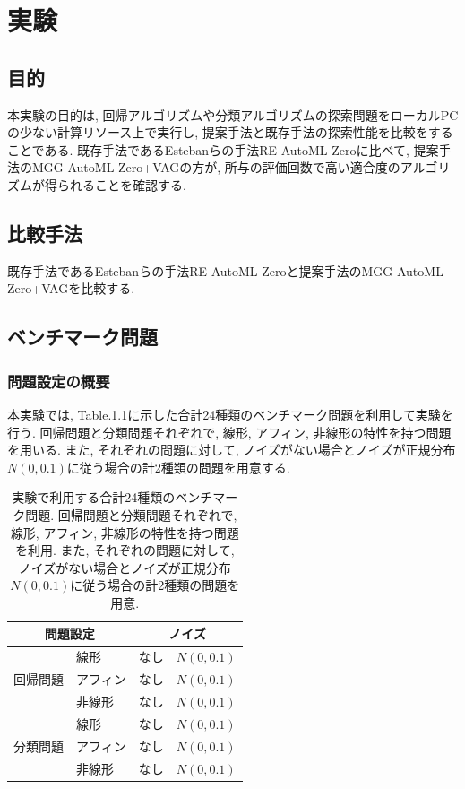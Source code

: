 \documentclass[11pt,oneside,openany,report]{jsbook}
\begin{document}
\chapter{実験} \label{chap:exp}

\section{目的}\label{sec:exp:purpose}

本実験の目的は, 回帰アルゴリズムや分類アルゴリズムの探索問題をローカルPCの少ない計算リソース上で実行し, 提案手法と既存手法の探索性能を比較をすることである. 既存手法であるEstebanらの手法RE-AutoML-Zero\cite{automl_zero}に比べて, 提案手法のMGG-AutoML-Zero+VAGの方が, 所与の評価回数で高い適合度のアルゴリズムが得られることを確認する.

\section{比較手法}\label{sec:exp:compair_method}
既存手法であるEstebanらの手法RE-AutoML-Zeroと提案手法のMGG-AutoML-Zero+VAGを比較する.

\section{ベンチマーク問題}\label{sec:exp:benchmark}

\subsection{問題設定の概要}

本実験では, Table.\ref{table:exp_benchmarks}に示した合計24種類のベンチマーク問題を利用して実験を行う. 回帰問題と分類問題それぞれで, 線形, アフィン, 非線形の特性を持つ問題を用いる. また, それぞれの問題に対して, ノイズがない場合とノイズが正規分布$N(0,0.1)$に従う場合の計2種類の問題を用意する.

\begin{table}[tbp]
  \caption{実験で利用する合計24種類のベンチマーク問題. 回帰問題と分類問題それぞれで, 線形, アフィン, 非線形の特性を持つ問題を利用. また, それぞれの問題に対して, ノイズがない場合とノイズが正規分布$N(0,0.1)$に従う場合の計2種類の問題を用意.}
  \label{table:exp_benchmarks}
  \centering
  \begin{tabular}{|l|l||cc|}
    \hline
    \multicolumn{2}{|c||}{問題設定} & \multicolumn{2}{|c|}{ノイズ} \\
    \hline
    \hline
    \multirow{3}{*}{回帰問題}
    & 線形 &  なし & $N(0,0.1)$ \\
    & アフィン& なし & $N(0,0.1)$ \\
    & 非線形 &  なし & $N(0,0.1)$ \\
    \hline
    \multirow{3}{*}{分類問題}
    & 線形 &  なし & $N(0,0.1)$ \\
    & アフィン& なし & $N(0,0.1)$ \\
    & 非線形&  なし & $N(0,0.1)$ \\
    \hline
  \end{tabular}
\end{table}
\end{document}

